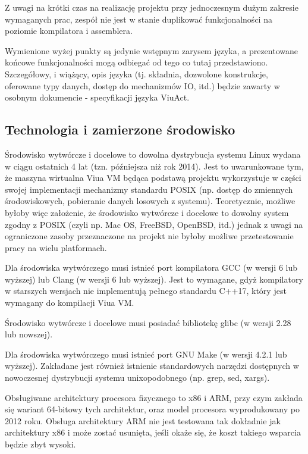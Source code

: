 \documentclass[11pt,oneside,a4paper,titlepage,onecolumn]{article}
\begin{document}
Z uwagi na krótki czas na realizację projektu przy jednoczesnym dużym zakresie wymaganych prac, zespół nie
jest w stanie duplikować funkcjonalności na poziomie kompilatora i assemblera.

Wymienione wyżej punkty są jedynie wstępnym zarysem języka, a prezentowane końcowe funkcjonalności mogą
odbiegać od tego co tutaj przedstawiono. Szczegółowy, i wiążący, opis języka (tj. składnia, dozwolone
konstrukcje, oferowane typy danych, dostęp do mechanizmów IO, itd.) będzie zawarty w osobnym dokumencie -
specyfikacji języka ViuAct.

\subsection{Technologia i zamierzone środowisko}
\label{sec:finalenvironment}

Środowisko wytwórcze i docelowe to dowolna dystrybucja systemu Linux wydana w ciągu ostatnich 4 lat (tzn.
późniejsza niż rok 2014). Jest to uwarunkowane tym, że maszyna wirtualna Viua VM będąca podstawą projektu
wykorzystuje w części swojej implementacji mechanizmy standardu POSIX (np. dostęp do zmiennych środowiskowych,
pobieranie danych losowych z systemu). Teoretycznie, możliwe byłoby więc założenie, że środowisko wytwórcze i
docelowe to dowolny system zgodny z POSIX (czyli np. Mac OS, FreeBSD, OpenBSD, itd.) jednak z uwagi na
ograniczone zasoby przeznaczone na projekt nie byłoby możliwe przetestowanie pracy na wielu platformach.

Dla środowiska wytwórczego musi istnieć port kompilatora GCC (w wersji 6 lub wyższej) lub Clang (w wersji 6
lub wyższej). Jest to wymagane, gdyż kompilatory w starszych wersjach nie implementują pełnego standardu
C++17, który jest wymagany do kompilacji Viua VM.

Środowisko wytwórcze i docelowe musi posiadać bibliotekę glibc (w wersji 2.28 lub nowszej).

Dla środowiska wytwórczego musi istnieć port GNU Make (w wersji 4.2.1 lub wyższej). Zakładane jest również
istnienie standardowych narzędzi dostępnych w nowoczesnej dystrybucji systemu unixopodobnego (np. grep, sed,
xargs).

Obsługiwane architektury procesora fizycznego to x86 i ARM, przy czym zakłada się wariant 64-bitowy tych
architektur, oraz model procesora wyprodukowany po 2012 roku. Obsługa architektury ARM nie jest testowana tak
dokładnie jak architektury x86 i może zostać usunięta, jeśli okaże się, że koszt takiego wsparcia będzie zbyt
wysoki.
\end{document}
